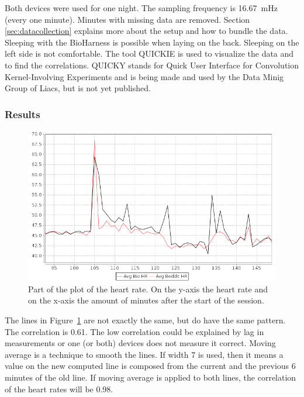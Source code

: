 			Both devices were used for one night. The sampling frequency is \SI{16.67}{\milli\hertz} (every one minute). Minutes with missing data are removed. Section \ref{sec:datacollection} explains more about the setup and how to bundle the data. Sleeping with the BioHarness is possible when laying on the back. Sleeping on the left side is not comfortable. The tool QUICKIE is used to visualize the data and to find the correlations. QUICKY stands for Quick User Interface for Convolution Kernel-Involving Experiments and is being made and used by the Data Minig Group of Liacs, but is not yet published.

		\subsubsection{Results}
			
			\begin{figure}[h]
				\centering
					\includegraphics[scale=0.5]{avgbiovsavgbeddit.png}
					\caption{Part of the plot of the heart rate. On the y-axis the heart rate and on the x-axis the amount of minutes after the start of the session.}
				\label{fig:avgbiovsavgbeddit}

			\end{figure}

			The lines in Figure~\ref{fig:avgbiovsavgbeddit} are not exactly the same, but do have the same pattern. The correlation is 0.61. The low correlation could be explained by lag in measurements or one (or both) devices does not measure it correct. Moving average is a technique to smooth the lines. If width 7 is used, then it means a value on the new computed line is composed from the current and the previous 6 minutes of the old line. If moving average is applied to both lines, the correlation of the heart rates will be 0.98.\
						
